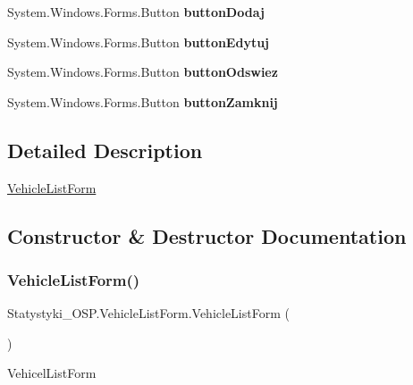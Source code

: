 \begin{DoxyCompactItemize}
System.\+Windows.\+Forms.\+Button {\bfseries button\+Dodaj}
\item 
\mbox{\label{class_statystyki___o_s_p_1_1_vehicle_list_form_a8ede1be05f1b0f2e4ba482e94ec83172}} 
System.\+Windows.\+Forms.\+Button {\bfseries button\+Edytuj}
\item 
\mbox{\label{class_statystyki___o_s_p_1_1_vehicle_list_form_adc5379da4a3ffc78f54e5cc54a13756b}} 
System.\+Windows.\+Forms.\+Button {\bfseries button\+Odswiez}
\item 
\mbox{\label{class_statystyki___o_s_p_1_1_vehicle_list_form_a08fb9ee71121816dc1074cf96d62a70e}} 
System.\+Windows.\+Forms.\+Button {\bfseries button\+Zamknij}
\end{DoxyCompactItemize}


\subsection{Detailed Description}
\mbox{\hyperlink{class_statystyki___o_s_p_1_1_vehicle_list_form}{Vehicle\+List\+Form}} 



\subsection{Constructor \& Destructor Documentation}
\mbox{\label{class_statystyki___o_s_p_1_1_vehicle_list_form_ada3657a1f3564a978e488301643e2271}} 
\subsubsection{\texorpdfstring{VehicleListForm()}{VehicleListForm()}}
{\footnotesize\ttfamily Statystyki\+\_\+\+O\+S\+P.\+Vehicle\+List\+Form.\+Vehicle\+List\+Form (\begin{DoxyParamCaption}{ }\end{DoxyParamCaption})}



Vehicel\+List\+Form 



